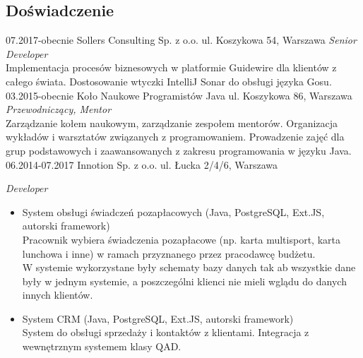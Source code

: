 \documentclass[]{friggeri-cv} %
\begin{document}
	\begin{absolutelynopagebreak}
		\section{Doświadczenie}
		\begin{entrylist}
			\entry
			{07.2017-obecnie}
			{Sollers Consulting Sp. z o.o.}
			{ul. Koszykowa 54, Warszawa}
			{\emph{Senior Developer}\\
				Implementacja procesów biznesowych w platformie Guidewire dla klientów z całego świata. Dostosowanie wtyczki IntelliJ Sonar do obsługi języka Gosu.
			}
			\entry
			{03.2015-obecnie}
			{Koło Naukowe Programistów Java}
			{ul. Koszykowa 86, Warszawa}
			{\emph{Przewodniczący, Mentor}\\
				Zarządzanie kołem naukowym, zarządzanie zespołem mentorów. Organizacja wykładów i warsztatów związanych z programowaniem. Prowadzenie zajęć dla grup podstawowych i zaawansowanych z zakresu programowania w języku Java.
			}
			\entry
			{06.2014-07.2017}
			{Innotion Sp. z o.o.}
			{ul. Łucka 2/4/6, Warszawa}
			{\emph{Developer}
			\begin{itemize}
				\item System obsługi świadczeń pozapłacowych (Java, PostgreSQL, Ext.JS, autorski framework)\\
					Pracownik wybiera świadczenia pozapłacowe (np. karta multisport, karta lunchowa i inne) w ramach przyznanego przez pracodawcę budżetu.\\
					W systemie wykorzystane były schematy bazy danych tak ab wszystkie dane były w jednym systemie, a poszczególni klienci nie mieli wglądu do danych innych klientów.
				\item System CRM (Java, PostgreSQL, Ext.JS, autorski framework)\\
					System do obsługi sprzedaży i kontaktów z klientami. Integracja z wewnętrznym systemem klasy QAD.
			\end{itemize}
			}
		\end{entrylist}
	\end{absolutelynopagebreak}
	
\end{document}

